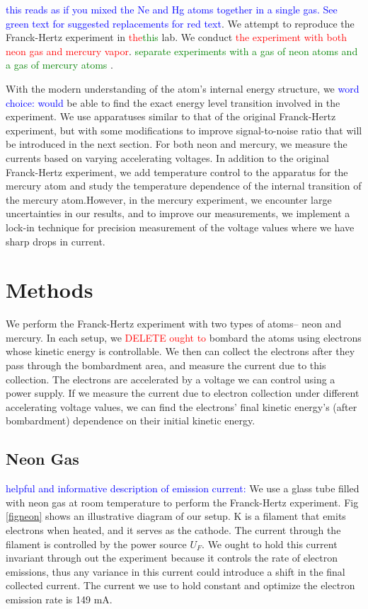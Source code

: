 \documentclass[prb,preprint]{revtex4-1}
\begin{document}
\textcolor{blue}{this reads as if you mixed the Ne and Hg atoms together in a single gas. See  green text for suggested replacements for red text}. We attempt to reproduce the Franck-Hertz experiment in \textcolor{red}{the}\textcolor{green}{this}  lab. We conduct \textcolor{red}{the experiment with both neon gas and mercury vapor}. \textcolor{green}{separate experiments with a gas of neon atoms and a gas of mercury atoms }. 

With the modern understanding of the atom's internal energy structure, we \textcolor{blue}{word choice: would} be able to find the exact energy level transition involved in the experiment. We use apparatuses similar to that of the original Franck-Hertz experiment, but with some modifications to improve signal-to-noise ratio that will be introduced in the next section. For both neon and mercury, we measure the currents based on varying accelerating voltages. In addition to the original Franck-Hertz experiment, we add temperature control to the apparatus for the mercury atom and study the temperature dependence of the internal transition of the mercury atom.However, in the mercury experiment, we encounter large uncertainties in our results, and to improve our measurements, we implement a lock-in technique for precision measurement of the voltage values where we have sharp drops in current.

\section{Methods}

We perform the Franck-Hertz experiment with two types of atoms-- neon and mercury. In each setup, we \textcolor{red}{DELETE ought to} bombard the atoms using electrons whose kinetic energy is controllable. We then can collect the electrons after they pass through the bombardment area, and measure the current due to this collection. The electrons are accelerated by a voltage we can control using a power supply. If we measure the current due to electron collection under different accelerating voltage values, we can find the electrons' final kinetic energy's (after bombardment) dependence on their initial kinetic energy.

\subsection{Neon Gas}

\textcolor{blue}{helpful and informative description of emission current:} We use a glass tube filled with neon gas at room temperature to perform the Franck-Hertz experiment. Fig \ref{figneon} shows an illustrative diagram of our setup. K is a filament that emits electrons when heated, and it serves as the cathode. The current through the filament is controlled by the power source $U_{F}$. We ought to hold this current invariant through out the experiment because it controls the rate of electron emissions, thus any variance in this current could introduce a shift in the final collected current. The current we use to hold constant and optimize the electron emission rate is 149 mA.
\end{document}
